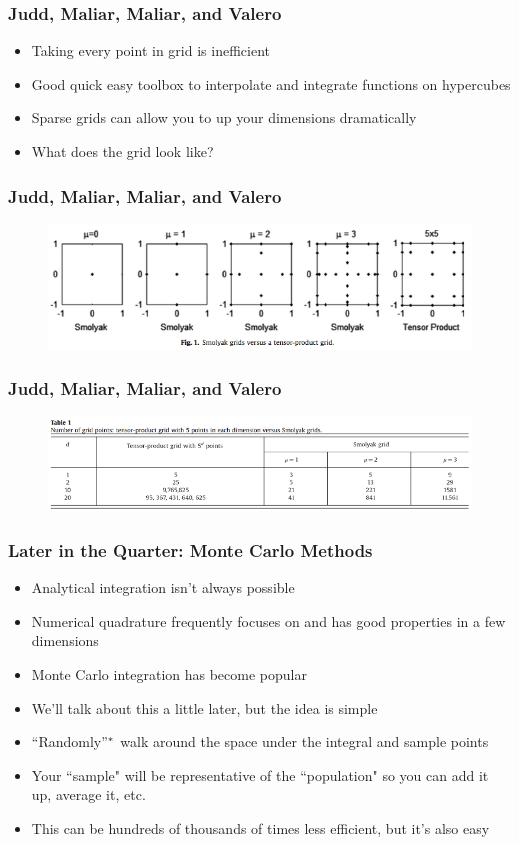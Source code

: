 \documentclass{beamer}
\begin{document}
\begin{frame}
\frametitle[alignment=center]{Judd, Maliar, Maliar, and Valero}
\begin{itemize}
\item Taking every point in grid is inefficient
\bigskip
\item Good quick easy toolbox to interpolate and integrate functions on hypercubes
\bigskip 
\item Sparse grids can allow you to up your dimensions dramatically
\bigskip 
\item What does the grid look like?
\end{itemize}
\end{frame}

\begin{frame}
\frametitle[alignment=center]{Judd, Maliar, Maliar, and Valero}
\begin{figure}
\centering
\includegraphics[scale=0.5]{Smolyak_1.png}
\end{figure}
\end{frame}

\begin{frame}
\frametitle[alignment=center]{Judd, Maliar, Maliar, and Valero}
\begin{figure}
\centering
\includegraphics[scale=0.45]{Smolyak_2.png}
\end{figure}
\end{frame}

\begin{frame}
\frametitle[alignment=center]{Later in the Quarter: Monte Carlo Methods}
\begin{itemize}
\item Analytical integration isn't always possible
\bigskip
\item Numerical quadrature frequently focuses on and has good properties in a few dimensions
\bigskip
\item Monte Carlo integration has become popular
\bigskip
\item We'll talk about this a little later, but the idea is simple
\bigskip
\item ``Randomly$"^*$ walk around the space under the integral and sample points
\bigskip
\item Your ``sample" will be representative of the ``population" so you can add it up, average it, etc.
\bigskip
\item This can be hundreds of thousands of times less efficient, but it's also easy
\end{itemize}
\end{frame}
\end{document}
